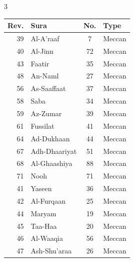 \documentclass{article}
\begin{document}
\begin{center}
\begin{multicols}{3}
        \begin{threeparttable}
            \begin{tabular}{@{}r l c l@{}}
                \textbf{Rev.} & \textbf{Sura}          & \textbf{No.} & \textbf{Type} \\
                \hline
                39            & Al-A'raaf\tnote{8}     & 7            & Meccan        \\
                40            & Al-Jinn                & 72           & Meccan        \\
                43            & Faatir                 & 35           & Meccan        \\
                48            & An-Naml                & 27           & Meccan        \\
                56            & As-Saaffaat            & 37           & Meccan        \\
                58            & Saba                   & 34           & Meccan        \\
                59            & Az-Zumar               & 39           & Meccan        \\
                61            & Fussilat               & 41           & Meccan        \\
                64            & Ad-Dukhaan             & 44           & Meccan        \\
                67            & Adh-Dhaariyat          & 51           & Meccan        \\
                68            & Al-Ghaashiya           & 88           & Meccan        \\
                71            & Nooh                   & 71           & Meccan        \\
                41            & Yaseen\tnote{9}        & 36           & Meccan        \\
                42            & Al-Furqaan\tnote{10}   & 25           & Meccan        \\
                44            & Maryam\tnote{11}       & 19           & Meccan        \\
                45            & Taa-Haa\tnote{12}      & 20           & Meccan        \\
                46            & Al-Waaqia\tnote{13}    & 56           & Meccan        \\
                47            & Ash-Shu'araa\tnote{14} & 26           & Meccan        \\

\end{tabular}
\end{threeparttable}
\end{multicols}
\end{center}
\end{document}
